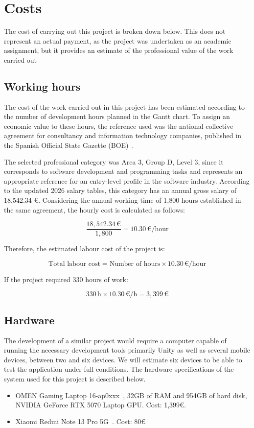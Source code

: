\section{Costs}
The cost of carrying out this project is broken down below. This does not represent an actual payment, as the project was undertaken as an academic assignment, but it provides an estimate of the professional value of the work carried out

\subsection{Working hours}
The cost of the work carried out in this project has been estimated according to the number of development hours planned in the Gantt chart.  To assign an economic value to these hours, the reference used was the national collective agreement for consultancy and information technology companies, published in the Spanish Official State Gazette (BOE)~\cite{boe_convenio}.


The selected professional category was Area 3, Group D, Level 3, since it corresponds to software development and programming tasks and represents an appropriate reference for an entry-level profile in the software industry.
According to the updated 2026 salary tables, this category has an annual gross salary of 18,542.34 €. Considering the annual working time of 1,800 hours established in the same agreement, the hourly cost is calculated as follows:


\[
\frac{18{,}542.34\,\text{€}}{1{,}800} = 10.30\,\text{€/hour}
\]

Therefore, the estimated labour cost of the project is: 

\[
\text{Total labour cost} = \text{Number of hours} \times 10.30\,\text{€/hour}
\]

If the project required 330 hours of work: 

 \[
330\,\text{h} \times 10.30\,\text{€/h} = 3,399\,\text{€}
\]

\subsection{Hardware}
The development of a similar project would require a computer capable of running the necessary development tools primarily Unity as well as several mobile devices, between two and six devices. We will estimate six devices to be able to test the application under full conditions. The hardware specifications of the system used for this project is described below.
\begin{itemize}
    \item OMEN Gaming Laptop 16-ap0xxx~\cite{hp_omen}, 32GB of RAM and 954GB of hard disk, NVIDIA GeForce RTX 5070 Laptop GPU. Cost: 1,399€.
    \item Xiaomi Redmi Note 13 Pro 5G~\cite{redmi_note}. Cost: 80€
\end{itemize}

